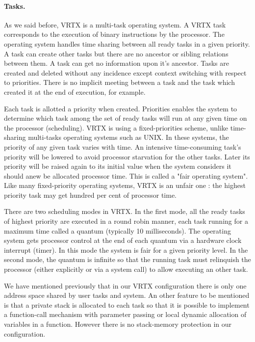\documentclass[10pt]{report}
\begin{document}
\paragraph{Tasks.} As we said before, VRTX is a multi-task operating system. A VRTX 
task corresponds to the execution of binary instructions by the 
processor. The operating system handles time sharing between all 
ready tasks in a given priority. A task can create other tasks 
but there are no ancestor or sibling relations between them. A 
task can get no information upon it's ancestor. Tasks are created 
and deleted without any incidence except context switching with 
respect to priorities. There is no implicit meeting between a task
and the task which created it at the end of execution, for example.

Each task is allotted a priority when created. Priorities enables 
the system to determine which task among the set of ready tasks 
will run at any given time on the processor (scheduling). VRTX is 
using a fixed-priorities scheme, unlike time-sharing multi-tasks 
operating systems such as UNIX. In these systems, the priority of 
any given task varies with time. An intensive time-consuming 
task's priority will be lowered to avoid processor starvation for 
the other tasks. Later its priority will be raised again to its 
initial value when the system considers it should anew be 
allocated processor time. This is called a "fair operating system".
Like many fixed-priority operating systems, VRTX is an unfair 
one : the highest priority task may get hundred per cent of 
processor time.

There are two scheduling modes in VRTX. In the first mode, all 
the ready tasks of highest priority are executed in a round robin 
manner, each task running for a maximum time called a quantum 
(typically 10 milliseconds). The operating system gets processor 
control at the end of each quantum via a hardware clock interrupt 
(timer). In this mode the system is fair for a given priority 
level. In the second mode, the quantum is infinite so that the 
running task must relinquish the processor (either explicitly or 
via a system call) to allow executing an other task.

We have mentioned previously that in our VRTX configuration there 
is only one address space shared by user tasks and system. An 
other feature to be mentioned is that a private stack is 
allocated to each task so that it is possible to implement a 
function-call mechanism with parameter passing or local dynamic 
allocation of variables in a function. However there is no 
stack-memory protection in our configuration.
\end{document}
